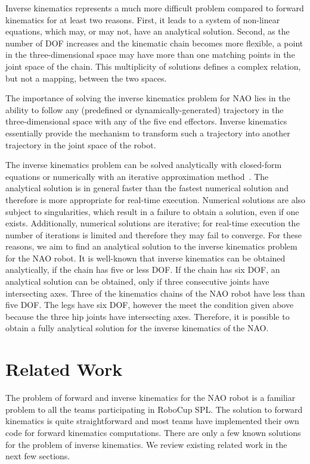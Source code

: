 Inverse kinematics represents a much more difficult problem compared to forward kinematics for at least two reasons. First, it leads to a system of non-linear equations, which may, or may not, have an analytical solution. Second, as the number of DOF increases and the kinematic chain becomes more flexible, a point in the three-dimensional space may have more than one matching points in the joint space of the chain. This multiplicity of solutions defines a complex relation, but not a mapping, between the two spaces.

The importance of solving the inverse kinematics problem for NAO lies in the ability to follow any (predefined or dynamically-generated) trajectory in the three-dimensional space with any of the five end effectors. Inverse kinematics essentially provide the mechanism to transform such a trajectory into another trajectory in the joint space of the robot. 

The inverse kinematics problem can be solved analytically with closed-form equations or numerically with an iterative approximation method~\cite{jacobianInverse}. The analytical solution is in general faster than the fastest numerical solution and therefore is more appropriate for real-time execution. Numerical solutions are also subject to singularities, which result in a failure to obtain a solution, even if one exists. Additionally, numerical solutions are iterative; for real-time execution the number of iterations is limited and therefore they may fail to converge. For these reasons, we aim to find an analytical solution to the inverse kinematics problem for the NAO robot. It is well-known that inverse kinematics can be obtained analytically, if the chain has five or less DOF. If the chain has six DOF, an analytical solution can be obtained, only if three consecutive joints have intersecting axes. Three of the kinematics chains of the NAO robot have less than five DOF. The legs have six DOF, however the meet the condition given above because the three hip joints have intersecting axes. Therefore, it is possible to obtain a fully analytical solution for the inverse kinematics of the NAO. 


\section{Related Work}

The problem of forward and inverse kinematics for the NAO robot is a familiar problem to all the teams participating in RoboCup SPL. The solution to forward kinematics is quite straightforward and most teams have implemented their own code for forward kinematics computations. There are only a few known solutions for the problem of inverse kinematics. We review existing related work in the next few sections. 

